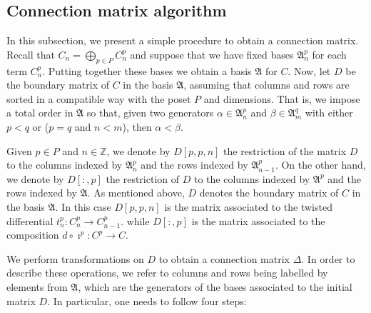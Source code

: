 \documentclass[11pt, table, nothms]{amsart}
\theoremstyle{definition}
\newcommand{\Z}{\mathbb{Z}}
\newcommand{\C}{C}
\newcommand{\fA}{\mathfrak{A}}
\newcommand{\fB}{\mathfrak{B}}
\newcommand{\fH}{\mathfrak{H}}
\newcommand{\fK}{\mathfrak{K}}
\begin{document}
{%
\subsection{Connection matrix algorithm}
\label{subsec:algorithm}

In this subsection, we present a simple procedure to obtain a connection matrix. 
Recall that $C_n = \bigoplus_{p \in P}\C^p_n$ and suppose that we have fixed bases $\fA^p_n$ for each term $\C^p_n$. 
Putting together these bases we obtain a basis $\fA$ for $C$.
Now, let $D$ be the boundary matrix of $C$ in the basis $\fA$, assuming that columns and rows are sorted in a compatible way with the poset $P$ and dimensions.
That is, we impose a total order in $\fA$ so that, given two generators $\alpha \in \fA^p_n$ and $\beta \in \fA^q_m$ with either $p<q$ or ($p=q$ and $n<m$), then $\alpha < \beta$.

Given $p \in P$ and $n \in \Z$, we denote by $D[p,p,n]$ the restriction of the matrix $D$ to the columns indexed by $\fA^p_n$ and the rows indexed by $\fA^p_{n-1}$.
On the other hand, we denote by $D[:,p]$ the restriction of $D$ to the columns indexed by $\fA^p$ and the rows indexed by $\fA$.
As mentioned above, $D$ denotes the boundary matrix of $C$ in the basis $\fA$. 
In this case $D[p,p,n]$ is the matrix associated to the twisted differential $t^p_n\colon \C^p_n\rightarrow \C^p_{n-1}$. 
while $D[:,p]$ is the matrix associated to the composition $d\circ \imath^p\colon C^p \rightarrow C$.

We perform transformations on $D$ to obtain a connection matrix $\Delta$. 
In order to describe these operations, we refer to columns and rows being labelled by elements from $\fA$, which are the generators of the bases associated to the initial matrix $D$.
In particular, one needs to follow four steps:
}
\end{document}
